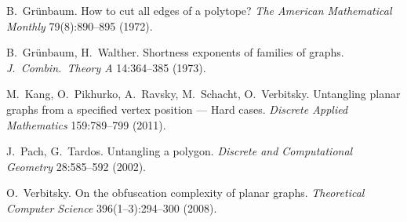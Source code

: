 \documentclass[reqno,12pt]{amsart}
\begin{document}
\begin{thebibliography}{10}
B.~Gr\"unbaum.
\newblock
How to cut all edges of a polytope?
\newblock
{\it The American Mathematical Monthly} 79(8):890--895 (1972).

B.~Gr\"unbaum, H.~Walther.
\newblock
Shortness exponents of families of graphs.
\newblock
{\it J.\ Combin.\ Theory A} 14:364--385 (1973).

M.~Kang, O.~Pikhurko, A.~Ravsky, M.~Schacht, O.~Verbitsky.
\newblock
Untangling planar graphs from a specified vertex position
--- Hard cases.
\newblock
{\it Discrete Applied Mathematics} 159:789--799 (2011).



J.~Pach, G.~Tardos.
\newblock
Untangling a polygon. 
\newblock
{\it Discrete and Computational Geometry\/} 28:585--592 (2002).

O.~Verbitsky.
\newblock
On the obfuscation complexity of planar graphs.
\newblock
{\it Theoretical Computer Science\/} 396(1--3):294--300 (2008).

\end{thebibliography}
\end{document}

